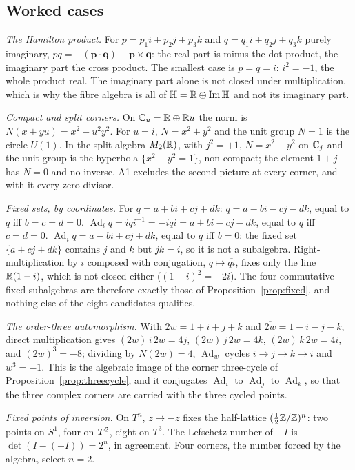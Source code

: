 \documentclass[11pt,a4paper]{article}
\theoremstyle{plain}
\theoremstyle{definition}
\theoremstyle{remark}
\newcommand{\Hquat}{\mathbb{H}}
\newcommand{\ImH}{\operatorname{Im}\Hquat}
\newcommand{\Ad}{\operatorname{Ad}}
\begin{document}
\subsection{Worked cases}\label{sec:fibre-worked}

\emph{The Hamilton product.} For $p=p_{1}i+p_{2}j+p_{3}k$ and $q=q_{1}i+q_{2}j+q_{3}k$ purely imaginary, $pq=-(\mathbf p\cdot\mathbf q)+\mathbf p\times\mathbf q$: the real part is minus the dot product, the imaginary part the cross product. The smallest case is $p=q=i$: $i^{2}=-1$, the whole product real. The imaginary part alone is not closed under multiplication, which is why the fibre algebra is all of $\Hquat=\R\oplus\ImH$ and not its imaginary part.

\emph{Compact and split corners.} On $\mathbb{C}_{u}=\mathbb{R}\oplus\mathbb{R} u$ the norm is $N(x+yu)=x^{2}-u^{2}y^{2}$. For $u=i$, $N=x^{2}+y^{2}$ and the unit group $N=1$ is the circle $U(1)$. In the split algebra $M_{2}(\mathbb{R})$, with $j^{2}=+1$, $N=x^{2}-y^{2}$ on $\mathbb{C}_{j}$ and the unit group is the hyperbola $\{x^{2}-y^{2}=1\}$, non-compact; the element $1+j$ has $N=0$ and no inverse. A1 excludes the second picture at every corner, and with it every zero-divisor.

\emph{Fixed sets, by coordinates.} For $q=a+bi+cj+dk$: $\bar q=a-bi-cj-dk$, equal to $q$ iff $b=c=d=0$. $\Ad_{i}q=iqi^{-1}=-iqi=a+bi-cj-dk$, equal to $q$ iff $c=d=0$. $\overline{\Ad_{i}q}=a-bi+cj+dk$, equal to $q$ iff $b=0$: the fixed set $\{a+cj+dk\}$ contains $j$ and $k$ but $jk=i$, so it is not a subalgebra. Right-multiplication by $i$ composed with conjugation, $q\mapsto\overline{qi}$, fixes only the line $\mathbb{R}(1-i)$, which is not closed either ($(1-i)^{2}=-2i$). The four commutative fixed subalgebras are therefore exactly those of Proposition~\ref{prop:fixed}, and nothing else of the eight candidates qualifies.

\emph{The order-three automorphism.} With $2w=1+i+j+k$ and $\overline{2w}=1-i-j-k$, direct multiplication gives $(2w)\,i\,\overline{2w}=4j$, $(2w)\,j\,\overline{2w}=4k$, $(2w)\,k\,\overline{2w}=4i$, and $(2w)^{3}=-8$; dividing by $N(2w)=4$, $\Ad_{w}$ cycles $i\to j\to k\to i$ and $w^{3}=-1$. This is the algebraic image of the corner three-cycle of Proposition~\ref{prop:threecycle}, and it conjugates $\Ad_{i}$ to $\Ad_{j}$ to $\Ad_{k}$, so that the three complex corners are carried with the three cycled points.

\emph{Fixed points of inversion.} On $T^{n}$, $z\mapsto-z$ fixes the half-lattice $(\tfrac12\mathbb{Z}/\mathbb{Z})^{n}$: two points on $S^{1}$, four on $T^2$, eight on $T^{3}$. The Lefschetz number of $-I$ is $\det(I-(-I))=2^{n}$, in agreement. Four corners, the number forced by the algebra, select $n=2$.
\end{document}

